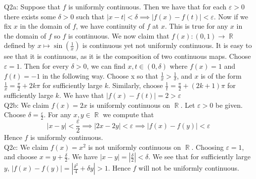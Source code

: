 \documentclass[letterpaper]{article}
\DeclareMathOperator{\R}{\mathbb{R}}
\begin{document}
\noindent Q2a: Suppose that $f$ is uniformly continuous. Then we have that for each $\varepsilon>0$ there exists some $\delta>0$ such that $|x-t|<\delta \implies |f(x)-f(t)|< \varepsilon$. 
Now if we fix $x$ in the domain of $f$, we have continuity of $f$ at $x$. This is true for any $x$ in the domain of $f$ so $f$ is continuous.
We now claim that $f(x): (0,1) \rightarrow \R$ defined by $x\mapsto \sin(\frac{1}{x})$ is continuous yet not uniformly continuous. It is easy to see that it is continuous, as it is the composition of two continuous maps. 
Choose $\varepsilon=1$. Then for every $\delta>0$, we can find $x,t\in (0,\delta)$ where $f(x)=1$ and $f(t)=-1$ in the following way. Choose x so that $\frac{1}{x}> \frac{1}{\delta}$, and $x$ is of the form $\frac{1}{x}=\frac{\pi}{2} + 2k\pi$ for sufficiently large $k$. 
Similarly, choose $\frac{1}{t} = \frac{\pi}{2} + (2k+1)\pi$ for sufficiently large $k$. We have that $|f(x)-f(t)|=2>\varepsilon$
\newline  \\ Q2b: We claim $f(x)=2x$ is uniformly continuous on $\R$. Let $\varepsilon>0$ be given. Choose $\delta = \frac{\varepsilon}{2}$. 
For any $x,y\in \R$ we compute that $$|x-y|< \frac{\varepsilon}{2}\implies |2x-2y|< \varepsilon \implies |f(x)-f(y)|< \varepsilon$$
Hence $f$ is uniformly continuous. 
\newline \\ Q2c: We claim $f(x)=x^2$ is not uniformly continuous on $\R$. Choosing $\varepsilon = 1$, and choose $x=y+ \frac{\delta}{2}$. We have $|x-y|=|\frac{\delta}{2}|<\delta$. We see that for sufficiently large $y$, $|f(x)-f(y)| = |\frac{\delta^2}{4}+ \delta y|>1$. Hence $f$ will not be uniformly continuous. 
\end{document}
